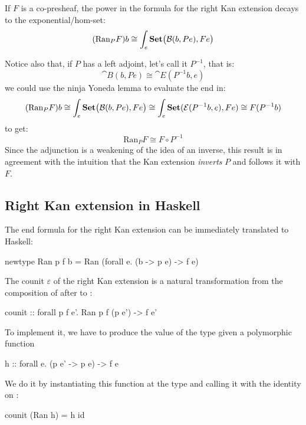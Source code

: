 \documentclass[DaoFP]{subfiles}
\begin{document}
If $F$ is a co-presheaf, the power in the formula for the right Kan extension decays to the exponential/hom-set:
  \[ (\text{Ran}_P F) b \cong \int_e \mathbf{Set} \big( \mathcal{B} (b, P e), F e\big) \]
 
 Notice also that, if $P$ has a left adjoint, let's call it $P^{-1}$, that is:
 \[ \cat B(b, P e) \cong \cat E(P^{-1} b, e) \]
 we could use the ninja Yoneda lemma to evaluate the end in:
 \[ (\text{Ran}_P F) b \cong \int_e \mathbf{Set} \big( \mathcal{B} (b, P e), F e\big) \cong \int_e \mathbf{Set}(\mathcal{E}(P^{-1} b, e), F e) \cong F(P^{-1} b)\]
to get:
 \[  \text{Ran}_P F \cong F \circ P^{-1} \]
 Since the adjunction is a weakening of the idea of an inverse, this result is in agreement with the intuition that the Kan extension \emph{inverts} $P$ and follows it with $F$.
 
 \subsection{Right Kan extension in Haskell}
The end formula for the right Kan extension can be immediately translated to Haskell:
 \begin{haskell}
newtype Ran p f b = Ran (forall e. (b -> p e) -> f e)
 \end{haskell}
 
 The counit $\varepsilon$ of the right Kan extension is a natural transformation from the composition of  after  to :
 \begin{haskell}
counit :: forall p f e'. Ran p f (p e') -> f e'
\end{haskell}
To implement it, we have to produce the value of the type  given a polymorphic function 
 \begin{haskell}
h :: forall e. (p e' -> p e) -> f e
\end{haskell}
We do it by instantiating this function at the type  and calling it with the identity on :
 \begin{haskell}
counit (Ran h) = h id
\end{haskell}
\end{document}
